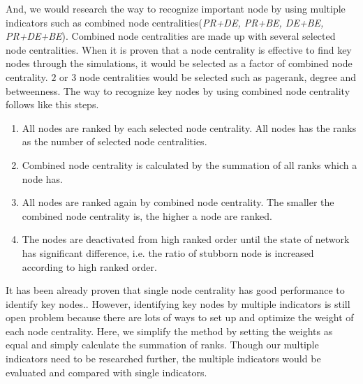 And, we would research the way to recognize important node by using multiple indicators such as combined node centralities(\textit{PR+DE, PR+BE, DE+BE, PR+DE+BE}). Combined node centralities are made up with several selected node centralities. When it is proven that a node centrality is effective to find key nodes through the simulations, it would be selected as a factor of combined node centrality. $2$ or $3$ node centralities would be selected such as pagerank, degree and betweenness. 
The way to recognize key nodes by using combined node centrality follows like this steps. 
\begin{enumerate}
	\item All nodes are ranked by each selected node centrality. All nodes has the ranks as the number of selected node centralities.  
	\item Combined node centrality is calculated by the summation of all ranks which a node has. 
	\item All nodes are ranked again by combined node centrality. The smaller the combined node centrality is, the higher a node are ranked.        
	\item The nodes are deactivated from high ranked order until the state of network has significant difference, i.e. the ratio of stubborn node is increased according to high ranked order. 
\end{enumerate}
It has been already proven that single node centrality has good performance to identify key nodes.\parencite{koschutzki2008, francisco2019, bianconi2018}. However, identifying key nodes by multiple indicators is still open problem because there are lots of ways to set up and optimize the weight of each node centrality.\parencite{huang2014}  Here, we simplify the method by setting the weights as equal and simply calculate the summation of ranks. Though our multiple indicators need to be researched further, the multiple indicators would be evaluated and compared with single indicators.
 
